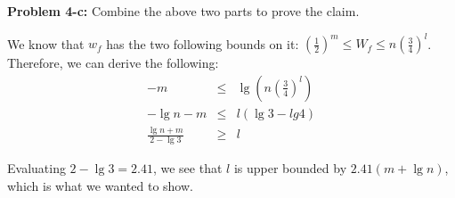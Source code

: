 \documentclass[psamsfonts]{amsart}
\newenvironment{sol}{\vspace{0.25cm}{\large \bfseries Solution:}}{\qedsymbol}
\newenvironment{prob}[1]{\begin{framed}{\large \bfseries Problem #1:}}{\end{framed}}
\begin{document}
\begin{prob}{4-c}
Combine the above two parts to prove the claim.
\end{prob}
\begin{sol}
We know that $w_f$ has the two following bounds on it: $\left( \frac{1}{2} \right)^m \leq W_f \leq n \left( \frac{3}{4} \right)^l$. Therefore, we can derive the following:
\begin{eqnarray}
-m &\leq& \lg \left( n \left( \frac{3}{4} \right)^l \right) \\
-\lg n - m &\leq& l (\lg 3 - lg 4) \\
\frac{\lg n + m}{2 - \lg 3} &\geq& l
\end{eqnarray}

Evaluating $2 - \lg 3 = 2.41$, we see that $l$ is upper bounded by $2.41(m + \lg n)$, which is what we wanted to show.
\end{sol}
\end{document}
